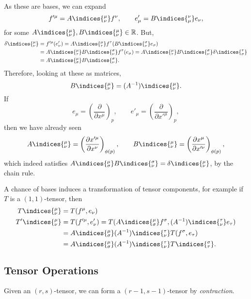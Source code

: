\documentclass[12pt]{article}
\begin{document}
As these are bases, we can expand
\[
f'^\mu = A\indices{^{\mu}_{\nu}} f^\nu, \qquad e'_\mu = B\indices{^{\nu}_{\mu}} e_\nu,
\]
for some $A\indices{^{\mu}_{\nu}}, B\indices{^{\mu}_{\nu}} \in \mathbb{R}$. But,
\begin{align*}
	\delta\indices{^{\mu}_{\nu}} &= f'^\mu (e'_\nu) = A\indices{^{\mu}_{\tau}} f^\tau ( B\indices{^{\sigma}_{\nu}} e_\sigma) \\
				     &= A\indices{^{\mu}_{\tau}} B\indices{^{\sigma}_{\nu}} f^\tau(e_\sigma) = A\indices{^{\mu}_{\tau}} B\indices{^{\sigma}_{\nu}} \delta\indices{^{\tau}_{\sigma}} \\
				     &= A\indices{^{\mu}_{\sigma}} B\indices{^{\sigma}_{\nu}}.
\end{align*}
Therefore, looking at these as matrices,
\[
B\indices{^{\mu}_{\nu}} = (A^{-1})\indices{^{\mu}_{\nu}}.
\]
If
\[
e_\mu = \left( \frac{\partial}{\partial x^\mu} \right)_p, \qquad e'_\mu = \left( \frac{\partial}{\partial x'^\mu} \right)_p,
\]
then we have already seen
\[
A\indices{^{\mu}_{\nu}} = \left( \frac{\partial x'^\mu}{\partial x^\nu} \right)_{\phi(p)}, \qquad B\indices{^{\mu}_{\nu}} = \left( \frac{\partial x^\mu}{\partial x'^\nu} \right)_{\phi(p)},
\]
which indeed satisfies $A\indices{^{\mu}_{\sigma}}B\indices{^{\sigma}_{\nu}} = \delta\indices{^{\mu}_{\nu}}$, by the chain rule.

A chance of bases induces a transformation of tensor components, for example if $T$ is a $(1, 1)$-tensor, then
\begin{align*}
	T\indices{^{\mu}_{\nu}} &= T(f^\mu, e_\nu) \\
	{T'}\indices{^{\mu}_{\nu}} &= T(f'^\mu, e'_\nu) = T(A\indices{^{\mu}_{\sigma}} f^\sigma, (A^{-1})\indices{^{\tau}_{\nu}} e_\tau ) \\
				 &= A\indices{^{\mu}_{\sigma}} (A^{-1})\indices{^{\tau}_{\nu}} T(f^\sigma, e_\tau) \\
				 &= A\indices{^{\mu}_{\sigma}} (A^{-1})\indices{^{\tau}_{\nu}} T\indices{^{\sigma}_{\tau}}.
\end{align*}


\subsection{Tensor Operations}%
\label{sub:top}

Given an $(r, s)$-tensor, we can form a $(r - 1, s-1)$-tensor by \emph{contraction}.
\end{document}
